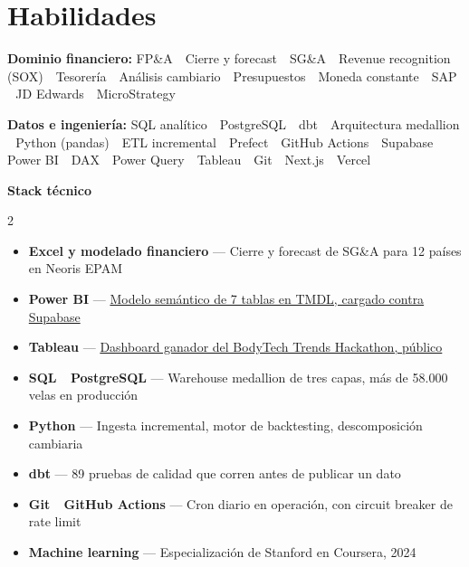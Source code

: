 \documentclass[a4paper,10pt]{article}
\begin{document}
\section*{Habilidades}
\textbf{\color{ink}Dominio financiero:} FP\&A \,\textperiodcentered\, Cierre y forecast \,\textperiodcentered\, SG\&A \,\textperiodcentered\, Revenue recognition (SOX) \,\textperiodcentered\, Tesorería \,\textperiodcentered\, Análisis cambiario \,\textperiodcentered\, Presupuestos \,\textperiodcentered\, Moneda constante \,\textperiodcentered\, SAP \,\textperiodcentered\, JD Edwards \,\textperiodcentered\, MicroStrategy\par\vspace{3pt}
\textbf{\color{ink}Datos e ingeniería:} SQL analítico \,\textperiodcentered\, PostgreSQL \,\textperiodcentered\, dbt \,\textperiodcentered\, Arquitectura medallion \,\textperiodcentered\, Python (pandas) \,\textperiodcentered\, ETL incremental \,\textperiodcentered\, Prefect \,\textperiodcentered\, GitHub Actions \,\textperiodcentered\, Supabase \,\textperiodcentered\, Power BI \,\textperiodcentered\, DAX \,\textperiodcentered\, Power Query \,\textperiodcentered\, Tableau \,\textperiodcentered\, Git \,\textperiodcentered\, Next.js \,\textperiodcentered\, Vercel\par\vspace{3pt}
\textbf{\color{ink}Stack técnico}\par\vspace{2pt}
\begin{multicols}{2}
\begin{itemize}[leftmargin=1.1em, itemsep=1pt, topsep=0pt, parsep=0pt]
  \item \textbf{\color{ink}Excel y modelado financiero} --- Cierre y forecast de SG\&A para 12 países en Neoris EPAM
  \item \textbf{\color{ink}Power BI} --- \href{https://proyecto-davirson-git.vercel.app/es/projects/powerbi}{Modelo semántico de 7 tablas en TMDL, cargado contra Supabase}
  \item \textbf{\color{ink}Tableau} --- \href{https://public.tableau.com/app/profile/davirson.novoa/viz/BodyTrendsADataAnalysisProject/TrendsAnalysis}{Dashboard ganador del BodyTech Trends Hackathon, público}
  \item \textbf{\color{ink}SQL \,\textperiodcentered\, PostgreSQL} --- Warehouse medallion de tres capas, más de 58.000 velas en producción
  \item \textbf{\color{ink}Python} --- Ingesta incremental, motor de backtesting, descomposición cambiaria
  \item \textbf{\color{ink}dbt} --- 89 pruebas de calidad que corren antes de publicar un dato
  \item \textbf{\color{ink}Git \,\textperiodcentered\, GitHub Actions} --- Cron diario en operación, con circuit breaker de rate limit
  \item \textbf{\color{ink}Machine learning} --- Especialización de Stanford en Coursera, 2024
\end{itemize}
\end{multicols}
\end{document}
